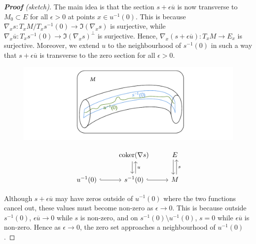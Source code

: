 \begin{proof}[\textbf{\textit{Proof}} (sketch)]
	The main idea is that the section $s+ \epsilon \overline{u}$ is now
	transverse to $M_0 \subset E$ for all $\epsilon > 0$ at points $x\in
	u^{-1}(0)$. This is because 
	$\nabla_x s : T_x M / T_x s^{-1}(0) \to \Im(\nabla_x s)$ is surjective, 
	while  $\nabla_x \overline{u} : T_x s^{-1}(0) \to \Im(\nabla_x s)^\perp$ 
	is surjective. Hence, $\nabla_x(s+\epsilon \overline{u}) : T_xM \to E_x$ is
	surjective. Moreover, we extend $u$ to the neighbourhood of  $s^{-1}(0)$ in 
	such a way that $s + \epsilon\overline{u}$ is transverse to the zero section for all
	$\epsilon > 0$. 
	\begin{figure}[htb]
		\begin{minipage}[c]{0.46\textwidth}
			\includegraphics[trim={43mm 5mm 41mm 2.8mm},clip,width=\textwidth]{figs/witten_coker.pdf}
		\end{minipage} 
		\begin{minipage}[c]{0.52\textwidth}
				\[\begin{tikzcd}
						& {\operatorname{coker}(\nabla s)} & E \\
							{u^{-1}(0)} & {s^{-1}(0)} & M
								\arrow[hook, from=2-1, to=2-2]
									\arrow[hook, from=2-2, to=2-3]
										\arrow[shift right=1, from=1-3, to=2-3]
											\arrow["u"', shift right=1,
											from=2-2, to=1-2]
												\arrow[shift right=1, from=1-2,
												to=2-2]
													\arrow["s"', shift right=1,
													from=2-3, to=1-3]
						\end{tikzcd}\]
			
		\end{minipage} 
	    \hfill
	\end{figure}
	Although $s+ \epsilon \overline{u}$ may have zeros outside of
	$u^{-1}(0)$ where the two functions cancel out, these values must
	become non-zero as $\epsilon\to 0$. This is because outside  $s^{-1}(0)$,
	$\epsilon\overline{u} \to 0$ while $s$ is non-zero, and on 
	$s^{-1}(0) \setminus u^{-1}(0)$,  $s=0$ while  $\epsilon \overline{u}$ is
	non-zero. Hence as $\epsilon \to 0$, the zero set approaches a
	neighbourhood of  $u^{-1}(0)$. 


\end{proof}

